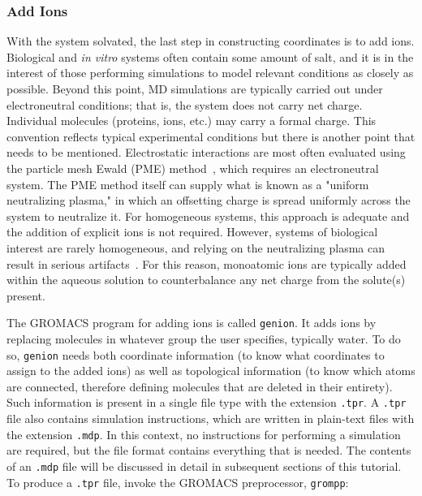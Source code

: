 \documentclass[9pt,tutorial,pubversion]{livecoms}
\begin{document}
\subsubsection{Add Ions} \label{lyso_ions}

With the system solvated, the last step in constructing coordinates is to add ions. Biological and {\em in vitro} systems often contain some amount of salt, and it is in the interest of those performing simulations to model relevant conditions as closely as possible. Beyond this point, MD simulations are typically carried out under electroneutral conditions; that is, the system does not carry net charge. Individual molecules (proteins, ions, etc.) may carry a formal charge. This convention reflects typical experimental conditions but there is another point that needs to be mentioned. Electrostatic interactions are most often evaluated using the particle mesh Ewald (PME) method~\cite{Darden1993,Essmann1995}, which requires an electroneutral system. The PME method itself can supply what is known as a "uniform neutralizing plasma," in which an offsetting charge is spread uniformly across the system to neutralize it. For homogeneous systems, this approach is adequate and the addition of explicit ions is not required. However, systems of biological interest are rarely homogeneous, and relying on the neutralizing plasma can result in serious artifacts~\cite{Hub2014}. For this reason, monoatomic ions are typically added within the aqueous solution to counterbalance any net charge from the solute(s) present.

The GROMACS program for adding ions is called \texttt{genion}. It adds ions by replacing molecules in whatever group the user specifies, typically water. To do so, \texttt{genion} needs both coordinate information (to know what coordinates to assign to the added ions) as well as topological information (to know which atoms are connected, therefore defining molecules that are deleted in their entirety). Such information is present in a single file type with the extension \texttt{.tpr}. A \texttt{.tpr} file also contains simulation instructions, which are written in plain-text files with the extension \texttt{.mdp}. In this context, no instructions for performing a simulation are required, but the file format contains everything that is needed. The contents of an \texttt{.mdp} file will be discussed in detail in subsequent sections of this tutorial. To produce a \texttt{.tpr} file, invoke the GROMACS preprocessor, \texttt{grompp}:
\end{document}
